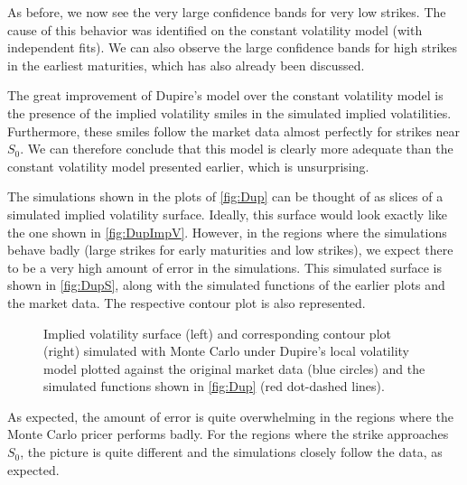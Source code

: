 As before, we now see the very large confidence bands for very low strikes. The cause of this behavior was identified on the constant volatility model (with independent fits). We can also observe the large confidence bands for high strikes in the earliest maturities, which has also already been discussed.

The great improvement of Dupire's model over the constant volatility model is the presence of the implied volatility smiles in the simulated implied volatilities. Furthermore, these smiles follow the market data almost perfectly for strikes near $S_0$.
We can therefore conclude that this model is clearly more adequate than the constant volatility model presented earlier, which is unsurprising.

The simulations shown in the plots of \autoref{fig:Dup} can be thought of as slices of a simulated implied volatility surface. Ideally, this surface would look exactly like the one shown in \autoref{fig:DupImpV}. However, in the regions where the simulations behave badly (large strikes for early maturities and low strikes), we expect there to be a very high amount of error in the simulations. This simulated surface is shown in \autoref{fig:DupS}, along with the simulated functions of the earlier plots and the market data. The respective contour plot is also represented.

\vfill
\newpage

\begin{figure}[H]
  \begin{subfigmatrix}{2}
  \end{subfigmatrix}
    \caption[Implied volatility surface and corresponding contour plot simulated with Monte Carlo under Dupire's local volatility model plotted against the original market data and the simulated functions shown in \autoref{fig:Dup}.]{Implied volatility surface (left) and corresponding contour plot (right) simulated with Monte Carlo under Dupire's local volatility model plotted against the original market data (blue circles) and the simulated functions shown in \autoref{fig:Dup} (red dot-dashed lines).}\label{fig:DupS}
\end{figure}   


As expected, the amount of error is quite overwhelming in the regions where the Monte Carlo pricer performs badly. For the regions where the strike approaches $S_0$, the picture is quite different and the simulations closely follow the data, as expected.


